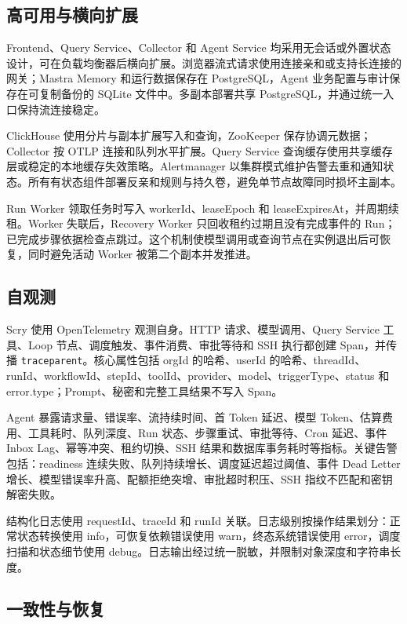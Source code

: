 \documentclass[conference,10pt]{IEEEtran}
\newcommand{\code}[1]{\texttt{#1}}
\begin{document}
\subsection{高可用与横向扩展}

Frontend、Query Service、Collector 和 Agent Service 均采用无会话或外置状态设计，可在负载均衡器后横向扩展。浏览器流式请求使用连接亲和或支持长连接的网关；Mastra Memory 和运行数据保存在 PostgreSQL，Agent 业务配置与审计保存在可复制备份的 SQLite 文件中。多副本部署共享 PostgreSQL，并通过统一入口保持流连接稳定。

ClickHouse 使用分片与副本扩展写入和查询，ZooKeeper 保存协调元数据；Collector 按 OTLP 连接和队列水平扩展。Query Service 查询缓存使用共享缓存层或稳定的本地缓存失效策略。Alertmanager 以集群模式维护告警去重和通知状态。所有有状态组件部署反亲和规则与持久卷，避免单节点故障同时损坏主副本。

Run Worker 领取任务时写入 workerId、leaseEpoch 和 leaseExpiresAt，并周期续租。Worker 失联后，Recovery Worker 只回收租约过期且没有完成事件的 Run；已完成步骤依据检查点跳过。这个机制使模型调用或查询节点在实例退出后可恢复，同时避免活动 Worker 被第二个副本并发推进。

\subsection{自观测}

Scry 使用 OpenTelemetry 观测自身。HTTP 请求、模型调用、Query Service 工具、Loop 节点、调度触发、事件消费、审批等待和 SSH 执行都创建 Span，并传播 \code{traceparent}。核心属性包括 orgId 的哈希、userId 的哈希、threadId、runId、workflowId、stepId、toolId、provider、model、triggerType、status 和 error.type；Prompt、秘密和完整工具结果不写入 Span。

Agent 暴露请求量、错误率、流持续时间、首 Token 延迟、模型 Token、估算费用、工具耗时、队列深度、Run 状态、步骤重试、审批等待、Cron 延迟、事件 Inbox Lag、幂等冲突、租约切换、SSH 结果和数据库事务耗时等指标。关键告警包括：readiness 连续失败、队列持续增长、调度延迟超过阈值、事件 Dead Letter 增长、模型错误率升高、配额拒绝突增、审批超时积压、SSH 指纹不匹配和密钥解密失败。

结构化日志使用 requestId、traceId 和 runId 关联。日志级别按操作结果划分：正常状态转换使用 info，可恢复依赖错误使用 warn，终态系统错误使用 error，调度扫描和状态细节使用 debug。日志输出经过统一脱敏，并限制对象深度和字符串长度。

\subsection{一致性与恢复}
\end{document}
